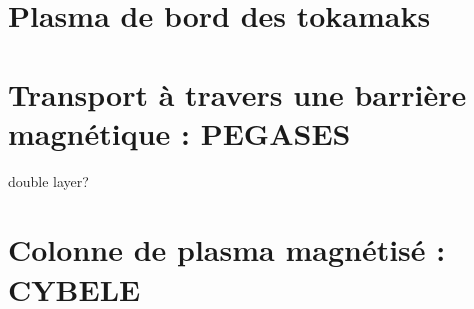 
	\section{Plasma de bord des tokamaks}
		 
	\section{Transport à travers une barrière magnétique : PEGASES}
		double layer?
	\section{Colonne de plasma magnétisé : CYBELE}
	